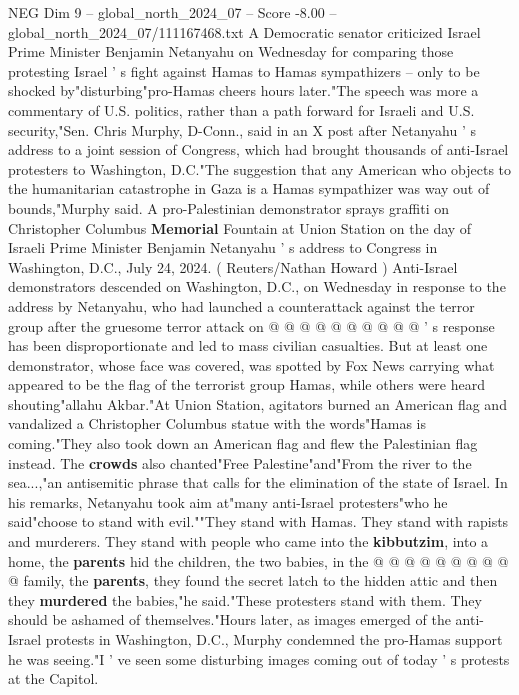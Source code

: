 \begin{textsample}{NEG Dim 9 – global\_north\_2024\_07 – Score -8.00 – global\_north\_2024\_07/111167468.txt}  \label{ex:f9_neg_155}
A Democratic senator criticized Israel Prime Minister Benjamin Netanyahu on Wednesday for comparing those protesting Israel ' s fight against Hamas to Hamas sympathizers -- only to be shocked by"disturbing"pro-Hamas cheers hours later."The speech was more a commentary of U.S. politics, rather than a path forward for Israeli and U.S. security,"Sen.
Chris Murphy, D-Conn., said in an X post after Netanyahu ' s address to a joint session of Congress, which had brought thousands of anti-Israel protesters to Washington, D.C."The suggestion that any American who objects to the humanitarian catastrophe in Gaza is a Hamas sympathizer was way out of bounds,"Murphy said.
A pro-Palestinian demonstrator sprays graffiti on Christopher Columbus \textbf{Memorial} Fountain at Union Station on the day of Israeli Prime Minister Benjamin Netanyahu ' s address to Congress in Washington, D.C., July 24, 2024. ( Reuters/Nathan Howard ) Anti-Israel demonstrators descended on Washington, D.C., on Wednesday in response to the address by Netanyahu, who had launched a counterattack against the terror group after the gruesome terror attack on @ @ @ @ @ @ @ @ @ @ ' s response has been disproportionate and led to mass civilian casualties.
But at least one demonstrator, whose face was covered, was spotted by Fox News carrying what appeared to be the flag of the terrorist group Hamas, while others were heard shouting"allahu Akbar."At Union Station, agitators burned an American flag and vandalized a Christopher Columbus statue with the words"Hamas is coming."They also took down an American flag and flew the Palestinian flag instead.
The \textbf{crowds} also chanted"Free Palestine"and"From the river to the sea...,"an antisemitic phrase that calls for the elimination of the state of Israel.
In his remarks, Netanyahu took aim at"many anti-Israel protesters"who he said"choose to stand with evil.""They stand with Hamas.
They stand with rapists and murderers.
They stand with people who came into the \textbf{kibbutzim}, into a home, the \textbf{parents} hid the children, the two babies, in the @ @ @ @ @ @ @ @ @ @ family, the \textbf{parents}, they found the secret latch to the hidden attic and then they \textbf{murdered} the babies,"he said."These protesters stand with them.
They should be ashamed of themselves."Hours later, as images emerged of the anti-Israel protests in Washington, D.C., Murphy condemned the pro-Hamas support he was seeing."I ' ve seen some disturbing images coming out of today ' s protests at the Capitol.

\end{textsample}
